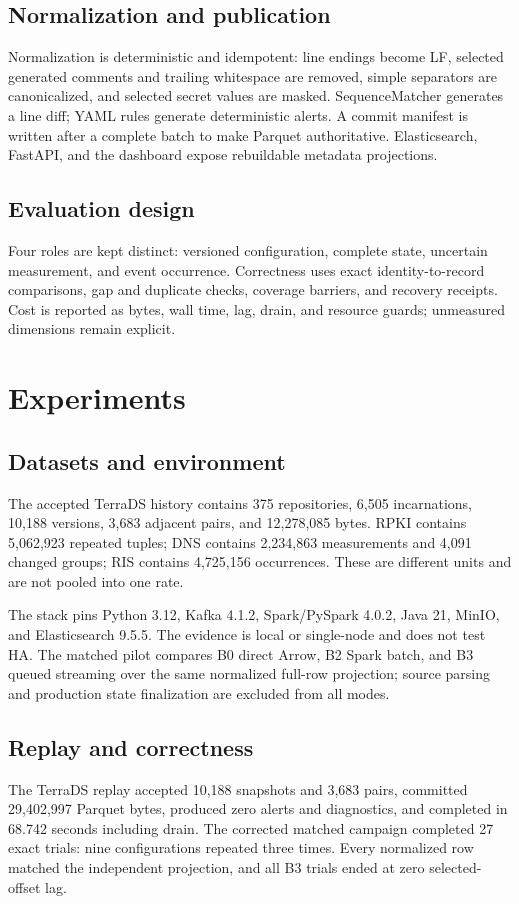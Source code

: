 \subsection{Normalization and publication}
Normalization is deterministic and idempotent: line endings become LF, selected generated comments and trailing whitespace are removed, simple separators are canonicalized, and selected secret values are masked. SequenceMatcher generates a line diff; YAML rules generate deterministic alerts. A commit manifest is written after a complete batch to make Parquet authoritative. Elasticsearch, FastAPI, and the dashboard expose rebuildable metadata projections.

\subsection{Evaluation design}
Four roles are kept distinct: versioned configuration, complete state, uncertain measurement, and event occurrence. Correctness uses exact identity-to-record comparisons, gap and duplicate checks, coverage barriers, and recovery receipts. Cost is reported as bytes, wall time, lag, drain, and resource guards; unmeasured dimensions remain explicit.

\section{Experiments}
\subsection{Datasets and environment}
The accepted TerraDS history contains 375 repositories, 6,505 incarnations, 10,188 versions, 3,683 adjacent pairs, and 12,278,085 bytes. RPKI contains 5,062,923 repeated tuples; DNS contains 2,234,863 measurements and 4,091 changed groups; RIS contains 4,725,156 occurrences. These are different units and are not pooled into one rate.

The stack pins Python 3.12, Kafka 4.1.2, Spark/PySpark 4.0.2, Java 21, MinIO, and Elasticsearch 9.5.5. The evidence is local or single-node and does not test HA. The matched pilot compares B0 direct Arrow, B2 Spark batch, and B3 queued streaming over the same normalized full-row projection; source parsing and production state finalization are excluded from all modes.

\subsection{Replay and correctness}
The TerraDS replay accepted 10,188 snapshots and 3,683 pairs, committed 29,402,997 Parquet bytes, produced zero alerts and diagnostics, and completed in 68.742 seconds including drain. The corrected matched campaign completed 27 exact trials: nine configurations repeated three times. Every normalized row matched the independent projection, and all B3 trials ended at zero selected-offset lag.

